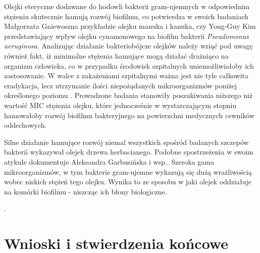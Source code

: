 \documentclass[11pt,a4paper]{report}
\begin{document}
Olejki eteryczne dodawane do hodowli bakterii gram-ujemnych w odpowiednim stężeniu skutecznie hamują rozwój biofilmu, co potwierdza w swoich badaniach Małgorzata Gniewosz\cite{manukaikanuka}na przykładzie olejku manuka i kanuka, czy Yong-Guy Kim\cite{kim} przedstawiający wpływ olejku cynamonowego na biofilm bakterii \textit{Pseudomonas aeruginosa}.  
Analizując działanie bakteriobójcze olejków należy wziąć pod uwagę również fakt, iż minimalne stężenia hamujące mogą działać drażniąco na organizm człowieka, co w przypadku środowisk szpitalnych uniemożliwiałoby ich zastosowanie. 
W walce z zakażeniami szpitalnymi ważna jest nie tyle całkowita eradykacja, lecz utrzymanie ilości niepożądanych mikroorganizmów poniżej określonego poziomu \cite{zakszpit16}. 
Prowadzone badania stanowiły poszukiwania niższego niż wartość MIC stężenia olejku, które jednocześnie w wystarczającym stopniu hamowałoby rozwój biofilmu bakteryjnego na powierzchni medycznych cewników oddechowych.

Silne działanie hamujące rozwój niemal wszystkich spośród badanych szczepów bakterii wykazywał olejek drzewa herbacianego. Podobne spostrzeżenia w swoim atykule dokumentuje Aleksandra Garbusińska i wsp.\cite{drzewo1, drzewo2}. Szeroka gama mikroorganizmów, w tym bakterie gram-ujemne wykazują się dużą wrażliwością wobec niskich stężeń tego olejku. Wynika to ze sposobu w jaki olejek oddziałuje na komórki biofilmu - niszcząc ich błony biologiczne.

\clearpage
.



\clearpage

\section{Wnioski i stwierdzenia końcowe}
\end{document}
